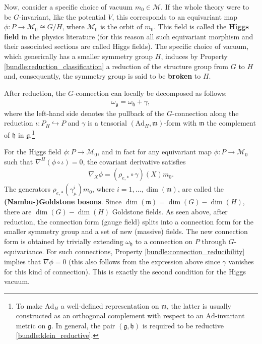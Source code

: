     Now, consider a specific choice of vacuum $m_0\in\mathcal{M}$. If the whole theory were to be $G$-invariant, like the potential $V$, this corresponds to an equivariant map $\phi:P\rightarrow \mathcal{M}_0\cong G/H$, where $\mathcal{M}_0$ is the orbit of $m_0$. This field is called the \textbf{Higgs field} in the physics literature (for this reason all such equivariant morphism and their associated sections are called Higgs fields). The specific choice of vacuum, which generically has a smaller symmetry group $H$, induces by Property \ref{bundle:reduction_classification} a reduction of the structure group from $G$ to $H$ and, consequently, the symmetry group is said to be \textbf{broken} to $H$.

    After reduction, the $G$-connection can locally be decomposed as follows:
    \begin{gather}
        \omega_\mathfrak{g} = \omega_\mathfrak{h} + \gamma,
    \end{gather}
    where the left-hand side denotes the pullback of the $G$-connection along the reduction $\iota:P_H\hookrightarrow P$ and $\gamma$ is a tensorial $(\mathrm{Ad}_H,\mathfrak{m})$-form with $\mathfrak{m}$ the complement of $\mathfrak{h}$ in $\mathfrak{g}$.\footnote{To make $\mathrm{Ad}_H$ a well-defined representation on $\mathfrak{m}$, the latter is usually constructed as an orthogonal complement with respect to an $\mathrm{Ad}$-invariant metric on $\mathfrak{g}$. In general, the pair $(\mathfrak{g},\mathfrak{h})$ is required to be reductive \ref{bundle:klein_reductive}.}

    For the Higgs field $\phi:P\rightarrow\mathcal{M}_0$, and in fact for any equivariant map $\phi:P\rightarrow\mathcal{M}_0$ such that $\nabla^H(\phi\circ\iota)=0$, the covariant derivative satisfies
    \begin{gather}
        \nabla_X\phi = (\rho_{e,\ast}\circ\gamma)(X)m_0.
    \end{gather}
    The generators $\rho_{e,\ast}(\gamma^i_\mu)m_0$, where $i=1,\ldots,\dim(\mathfrak{m})$, are called the \textbf{(Nambu-)Goldstone bosons}. Since $\dim(\mathfrak{m})=\dim(G)-\dim(H)$, there are $\dim(G)-\dim(H)$ Goldstone fields. As seen above, after reduction, the connection form (gauge field) splits into a connection form for the smaller symmetry group and a set of new (massive) fields. The new connection form is obtained by trivially extending $\omega_\mathfrak{h}$ to a connection on $P$ through $G$-equivariance. For such connections, Property \ref{bundle:connection_reducibility} implies that $\nabla\phi=0$ (this also follows from the expression above since $\gamma$ vanishes for this kind of connection). This is exactly the second condition for the Higgs vacuum.